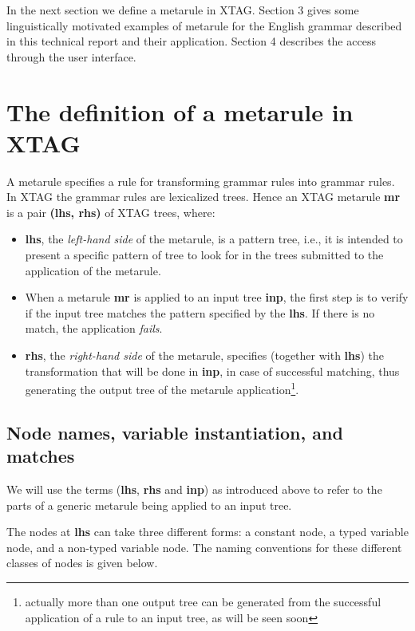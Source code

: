 In the next section we define a metarule in XTAG. 
Section 3 gives some
linguistically motivated examples
of metarule for the English grammar described in this
technical report and their application. Section 4 describes the access through 
the user interface.

\section{The definition of a metarule in XTAG}

A metarule specifies a rule for transforming grammar rules into grammar rules. 
In XTAG the grammar 
rules are lexicalized trees. Hence an XTAG metarule {\bf mr} 
is a pair {\bf (lhs, rhs)} of XTAG trees, where:

\begin{itemize}
\item {\bf lhs}, the {\it left-hand side} of the metarule, is a pattern tree,
        i.e., it is intended to present a specific pattern of tree to look for
        in the trees submitted to the application of the metarule.

\item When a metarule {\bf mr} is applied to an input tree {\bf inp}, the first
        step is to verify if the input tree matches the pattern specified by
        the {\bf lhs}. If there is no match, the application {\it fails}.

\item {\bf rhs}, the {\it right-hand side} of the metarule, specifies (together
        with {\bf lhs}) the transformation that will be done in {\bf inp},
        in case of successful matching, thus generating the output tree of
        the metarule application\footnote{actually more than one output tree 
        can be generated from the successful application of a rule to an 
        input tree, as will be seen soon}.
\end{itemize}
 
\subsection{Node names, variable instantiation, and matches}

We will use the terms ({\bf lhs}, {\bf rhs} and {\bf inp}) as introduced above
to refer to the parts of a generic metarule being applied to an input tree. 

The nodes at {\bf lhs} can take three 
different forms: a constant node, a typed variable node, and a non-typed 
variable node. The naming conventions for these different classes of nodes is 
given below.

